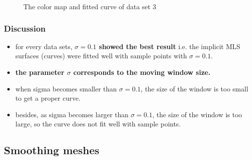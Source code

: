 \documentclass[paper=a4, fontsize=11pt]{scrartcl} %
\numberwithin{equation}{section} %
\numberwithin{figure}{section} %
\numberwithin{table}{section} %
\begin{document}
\begin{figure}[H]
\caption{The color map and fitted curve of data set 3\label{fig:simple}}
\noindent{}
\end{figure} 
\subsubsection{Discussion}

\begin{itemize}
	\item for every data sets, \textbf{$\sigma = 0.1$ showed the best result} i.e. the implicit MLS surfaces (curves) were fitted well with sample points with $\sigma = 0.1$.
	\item \textbf{the parameter $\sigma$ corresponds to the moving window size.} 
	\item when sigma becomes smaller than $\sigma = 0.1$, the size of the window is too small to get a proper curve.  
	\item besides, as sigma becomes larger than $\sigma = 0.1$, the size of the window is too large, so the curve does not fit well with sample points.
\end{itemize}
 
\subsection{Smoothing meshes}
\end{document}
